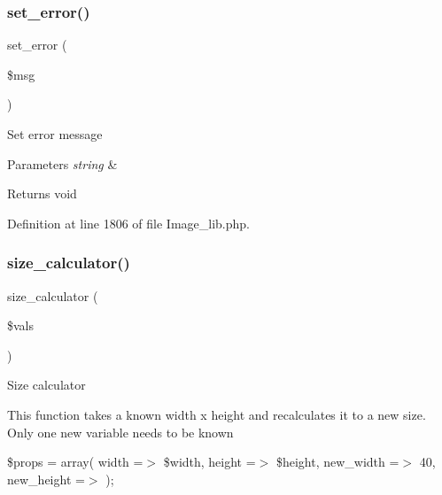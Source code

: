 \mbox{\label{class_c_i___image__lib_a892f1ba7cba3731a3fc68f1f64e92610}} 
\subsubsection{\texorpdfstring{set\_error()}{set\_error()}}
{\footnotesize\ttfamily set\+\_\+error (\begin{DoxyParamCaption}\item[{}]{\$msg }\end{DoxyParamCaption})}

Set error message


\begin{DoxyParams}{Parameters}
{\em string} & \\
\hline
\end{DoxyParams}
\begin{DoxyReturn}{Returns}
void 
\end{DoxyReturn}


Definition at line 1806 of file Image\+\_\+lib.\+php.

\mbox{\label{class_c_i___image__lib_a827549db4de2281a8f2b35ada2ef3909}} 
\subsubsection{\texorpdfstring{size\_calculator()}{size\_calculator()}}
{\footnotesize\ttfamily size\+\_\+calculator (\begin{DoxyParamCaption}\item[{}]{\$vals }\end{DoxyParamCaption})}

Size calculator

This function takes a known width x height and recalculates it to a new size. Only one new variable needs to be known

\$props = array( \textquotesingle{}width\textquotesingle{} =$>$ \$width, \textquotesingle{}height\textquotesingle{} =$>$ \$height, \textquotesingle{}new\+\_\+width\textquotesingle{} =$>$ 40, \textquotesingle{}new\+\_\+height\textquotesingle{} =$>$ \textquotesingle{}\textquotesingle{} );


